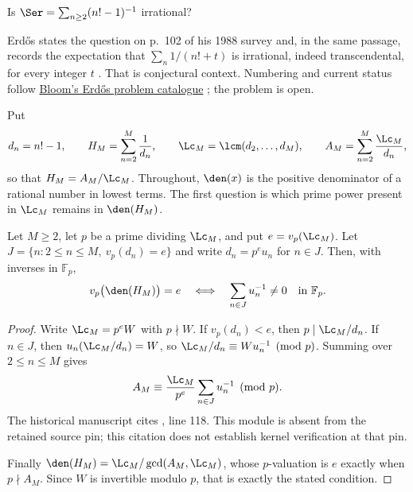 \begin{problem}[Erd\H{o}s \#68]\label{long68:res:problem}
Is $\Ser=\sum_{n\ge2}(n!-1)^{-1}$ irrational?
\end{problem}

\noindent Erd\H{o}s states the question on p.~102 of his 1988 survey and, in
the same passage, records the expectation that $\sum_n1/(n!+t)$ is
irrational, indeed transcendental, for every integer $t$
\cite[p.~102]{erdos1988}.  That is conjectural context.  Numbering and
current status follow \href{https://www.erdosproblems.com/68}{Bloom's
Erd\H{o}s problem catalogue} \cite{bloom}; the problem is open.

Put
\[
 d_n=n!-1,\qquad H_M=\sum_{n=2}^{M}\frac1{d_n},\qquad
 \Lc_M=\lcm(d_2,\ldots,d_M),\qquad
 A_M=\sum_{n=2}^{M}\frac{\Lc_M}{d_n},
\]
so that $H_M=A_M/\Lc_M$.  Throughout, $\den(x)$ is the positive denominator
of a rational number in lowest terms.  The first question is which prime
power present in $\Lc_M$ remains in $\den(H_M)$.

\label{long68:res:lead-prime-pole}
\begin{theorem}\label{long68:res:prime-pole}
Let $M\ge2$, let $p$ be a prime dividing $\Lc_M$, and put $e=v_p(\Lc_M)$.
Let $J=\{n:2\le n\le M,\ v_p(d_n)=e\}$ and write $d_n=p^eu_n$ for $n\in J$.
Then, with inverses in $\mathbb F_p$,
\begin{equation}\label{long68:eq:prime-pole-survival}
 v_p\bigl(\den(H_M)\bigr)=e
 \quad\Longleftrightarrow\quad
 \sum_{n\in J}u_n^{-1}\ne0\quad\hbox{in }\mathbb F_p.
\end{equation}
\end{theorem}

\begin{proof}
Write $\Lc_M=p^eW$ with $p\nmid W$.  If $v_p(d_n)<e$, then $p\mid\Lc_M/d_n$.
If $n\in J$, then $u_n(\Lc_M/d_n)=W$, so $\Lc_M/d_n\equiv Wu_n^{-1}\pmod p$.
Summing over $2\le n\le M$ gives
\begin{equation}\label{long68:eq:prime-pole-residue}
 A_M\equiv \frac{\Lc_M}{p^e}\sum_{n\in J}u_n^{-1}\pmod p.
\end{equation}
  The historical manuscript cites , line 118. This module is absent from the retained source pin; this citation does not establish kernel verification at that pin.

Finally $\den(H_M)=\Lc_M/\gcd(A_M,\Lc_M)$, whose $p$-valuation is $e$ exactly
when $p\nmid A_M$.  Since $W$ is invertible modulo $p$, that is exactly the
stated condition.
\end{proof}

